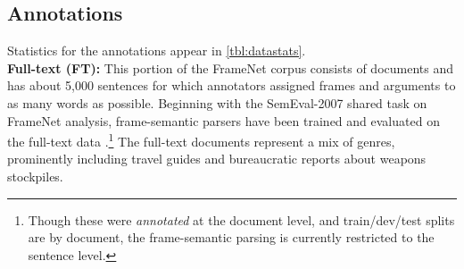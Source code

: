 \documentclass[11pt,a4paper]{article}
\newcommand{\fnf}[1]{\textsc{\textsf{#1}}} %
\newcommand{\fnr}[1]{\textbf{\textsf{#1}}} %
\newcommand{\finalversion}[1]{}
\begin{document}
\subsection{Annotations}
Statistics for the annotations appear in \cref{tbl:datastats}.\\
\textbf{Full-text (FT):} This portion of the FrameNet corpus consists of documents and has about 5,000
sentences for which annotators assigned frames and arguments to as many words as possible.
Beginning with the SemEval-2007 shared task on FrameNet analysis,
frame-semantic parsers have been trained and evaluated on the full-text data
 \citep{baker-07,das-14}.\footnote{Though these 
were \emph{annotated} at the document level, and train/dev/test splits are by document, the frame-semantic parsing 
is currently restricted to the sentence level.}
% 
% 
The full-text documents represent a mix of genres, prominently including travel guides 
and bureaucratic reports about weapons stockpiles. 
\end{document}
